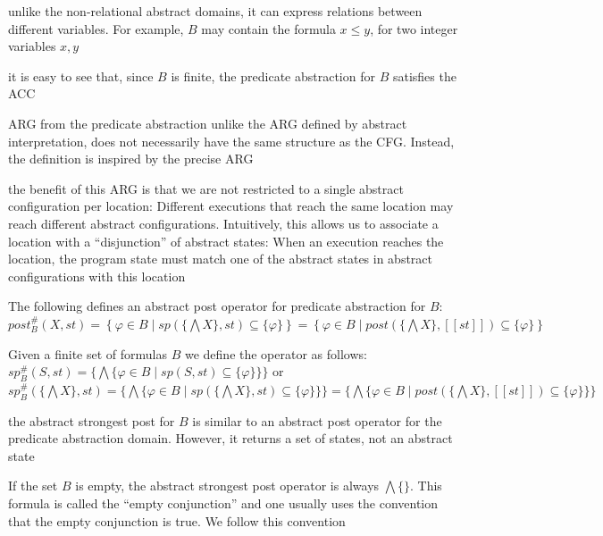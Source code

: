 \documentclass[landscape, a4paper]{article}
\begin{document}
\begin{minipage}[t]{0.2\linewidth}
\begin{betterlist}
\begin{betterlist}
		\end{betterlist}\color{black}
		\item unlike the non-relational abstract domains, it can express relations between different variables. For example, $B$ may contain the formula $x \le y$, for two integer variables $x, y$
		\item it is easy to see that, since $B$ is finite, the predicate abstraction for $B$ satisfies the ACC
		\item ARG from the predicate abstraction unlike the ARG defined by abstract interpretation, does not necessarily have the same structure as the CFG. Instead, the definition is inspired by the precise ARG
		\item the benefit of this ARG is that we are not restricted to a single abstract configuration per location: Different executions that reach the same location may reach different abstract configurations. Intuitively, this allows us to associate a location with a \enquote{disjunction} of abstract states: When an execution reaches the location, the program state must match one of the abstract states in abstract configurations with this location
		\item \color{violet}The following defines an \alert{abstract post operator} for predicate abstraction for $B$: $post^\#_B(X, st) = \left\{\varphi \in B \mid sp(\{\bigwedge X\}, st) \subseteq \{\varphi\}\right\} = \left\{\varphi \in B \mid post(\{\bigwedge X\}, [[st]]) \subseteq \{\varphi\}\right\}$\color{black}
		\item \color{orange}Given a finite set of formulas $B$ we define the  operator as follows: $sp^\#_B(S, st) = \{\bigwedge \{\varphi \in B \mid sp(S, st) \subseteq \{\varphi\}\}\}$ or $sp^\#_B(\{\bigwedge X\}, st) = \{\bigwedge \{\varphi \in B \mid sp(\{\bigwedge X\}, st) \subseteq \{\varphi\}\}\} = \{\bigwedge \{\varphi \in B \mid post(\{\bigwedge X\}, [[st]]) \subseteq \{\varphi\}\}\}$\color{black}
		\begin{betterlist}
			\item the abstract strongest post for $B$ is similar to an abstract post operator for the predicate abstraction domain. However, it returns a set of states, not an abstract state
			\item If the set $B$ is empty, the abstract strongest post operator is always $\bigwedge\{\}$. This formula is called the \enquote{empty conjunction} and one usually uses the convention that the empty conjunction is true. We follow this convention

\end{betterlist}
\end{betterlist}
\end{minipage}
\end{document}
